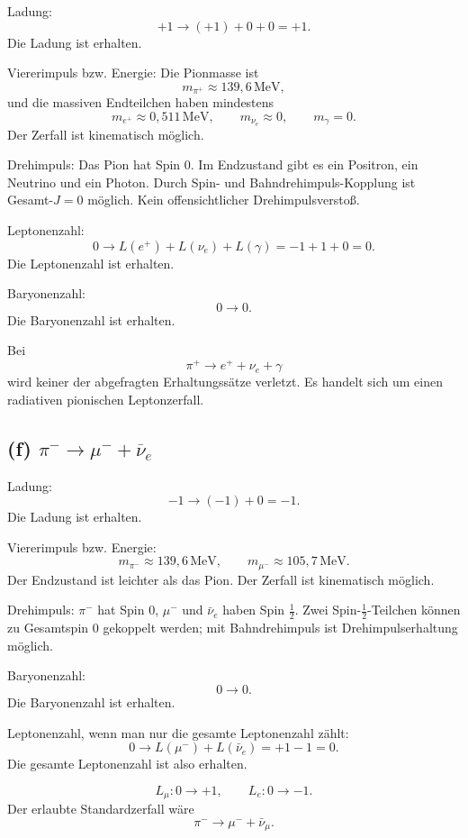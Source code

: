 \documentclass[11pt,a4paper]{scrartcl}
\begin{document}
\begin{calculationbox}
Ladung:
\[
+1\to(+1)+0+0=+1.
\]
Die Ladung ist erhalten.

\begin{calculationbox}
Viererimpuls bzw. Energie: Die Pionmasse ist
\[
m_{\pi^+}\approx139{,}6\,\mathrm{MeV},
\]
und die massiven Endteilchen haben mindestens
\[
m_{e^+}\approx0{,}511\,\mathrm{MeV},
\qquad
m_{\nu_e}\approx0,
\qquad
m_\gamma=0.
\]
Der Zerfall ist kinematisch möglich.
\end{calculationbox}

\begin{calculationbox}
Drehimpuls: Das Pion hat Spin $0$. Im Endzustand gibt es ein Positron, ein Neutrino und ein Photon. Durch Spin- und Bahndrehimpuls-Kopplung ist Gesamt-$J=0$ möglich. Kein offensichtlicher Drehimpulsverstoß.

Leptonenzahl:
\[
0\to L(e^+)+L(\nu_e)+L(\gamma)=-1+1+0=0.
\]
Die Leptonenzahl ist erhalten.

Baryonenzahl:
\[
0\to0.
\]
Die Baryonenzahl ist erhalten.
\end{calculationbox}
\end{calculationbox}

\begin{answerbox}
Bei
\[
\pi^+\to e^++\nu_e+\gamma
\]
wird keiner der abgefragten Erhaltungssätze verletzt. Es handelt sich um einen radiativen pionischen Leptonzerfall.
\end{answerbox}

\subsection*{(f) $\pi^-\to\mu^-+\overline\nu_e$}

\begin{calculationbox}
Ladung:
\[
-1\to(-1)+0=-1.
\]
Die Ladung ist erhalten.

\begin{calculationbox}
Viererimpuls bzw. Energie:
\[
m_{\pi^-}\approx139{,}6\,\mathrm{MeV},
\qquad
m_{\mu^-}\approx105{,}7\,\mathrm{MeV}.
\]
Der Endzustand ist leichter als das Pion. Der Zerfall ist kinematisch möglich.
\end{calculationbox}

\begin{calculationbox}
Drehimpuls: $\pi^-$ hat Spin $0$, $\mu^-$ und $\bar\nu_e$ haben Spin $\frac12$. Zwei Spin-$\frac12$-Teilchen können zu Gesamtspin $0$ gekoppelt werden; mit Bahndrehimpuls ist Drehimpulserhaltung möglich.

Baryonenzahl:
\[
0\to0.
\]
Die Baryonenzahl ist erhalten.

Leptonenzahl, wenn man nur die gesamte Leptonenzahl zählt:
\[
0\to L(\mu^-)+L(\bar\nu_e)=+1-1=0.
\]
Die gesamte Leptonenzahl ist also erhalten.

\begin{calculationbox}
\[
L_\mu:0\to +1,
\qquad
L_e:0\to -1.
\]
Der erlaubte Standardzerfall wäre
\[
\pi^-\to\mu^-+\bar\nu_\mu.
\]
\end{calculationbox}
\end{calculationbox}
\end{calculationbox}
\end{document}

